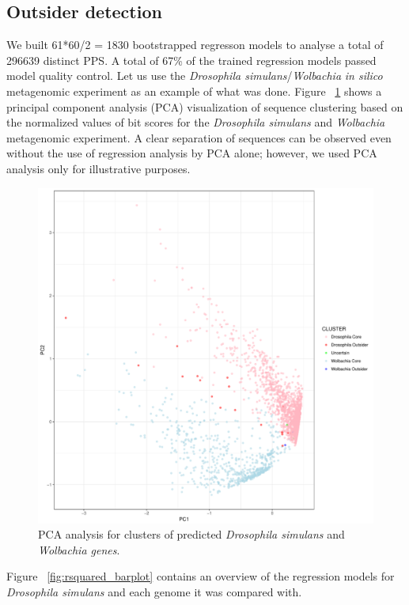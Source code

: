 \subsection{Outsider detection}
\label{outsider_detection}
We built 61*60/2 = 1830 bootstrapped regresson models to analyse a total
of 296639 distinct PPS. A total of 67\% of the trained regression models passed
model quality control. Let us use the \textit{Drosophila simulans}/\textit{Wolbachia}
\textit{in silico} metagenomic experiment as an example of what was done. Figure
~\ref{fig:pca_analysis} shows a principal component analysis (PCA)
visualization of sequence clustering based on the normalized values of
bit scores for the \textit{Drosophila simulans} and \textit{Wolbachia}
metagenomic experiment. A clear separation of sequences can be observed even
without the use of regression analysis by PCA alone; however, we used PCA
analysis only for illustrative purposes.
\begin{center}
\begin{figure}
\includegraphics[width=12cm]{figures/w_eds_vs_ds_bootstrapped_pc1_pc2.pdf}
\caption{PCA analysis for clusters of predicted \textit{Drosophila simulans}
	and \textit{Wolbachia genes}.}
\label{fig:pca_analysis}
\end{figure}
\end{center}
Figure ~\ref{fig:rsquared_barplot} contains an overview of the regression
models for \textit{Drosophila simulans} and each genome it was compared with.
